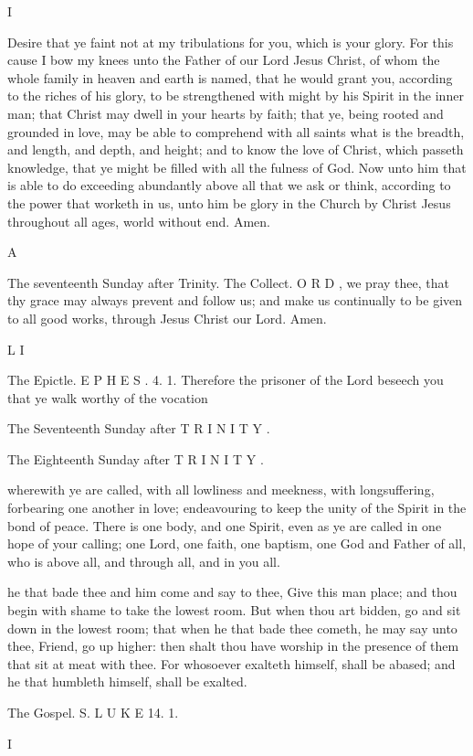 I

Desire that ye faint not at my tribulations for you, which is your glory. For this cause I bow my knees unto the Father of our Lord Jesus Christ, of whom the whole family in heaven and earth is named, that he would grant you, according to the riches of his glory, to be strengthened with might by his Spirit in the inner man; that Christ may dwell in your hearts by faith; that ye, being rooted and grounded in love, may be able to comprehend with all saints what is the breadth, and length, and depth, and height; and to know the love of Christ, which passeth knowledge, that ye might be filled with all the fulness of God. Now unto him that is able to do exceeding abundantly above all that we ask or think, according to the power that worketh in us, unto him be glory in the Church by Christ Jesus throughout all ages, world without end. Amen.

A

The seventeenth Sunday after Trinity. The Collect. O R D , we pray thee, that thy grace may always prevent and follow us; and make us continually to be given to all good works, through Jesus Christ our Lord. Amen.

L I

The Epictle. E P H E S . 4. 1. Therefore the prisoner of the Lord beseech you that ye walk worthy of the vocation

The Seventeenth Sunday after T R I N I T Y .

The Eighteenth Sunday after T R I N I T Y .

wherewith ye are called, with all lowliness and meekness, with longsuffering, forbearing one another in love; endeavouring to keep the unity of the Spirit in the bond of peace. There is one body, and one Spirit, even as ye are called in one hope of your calling; one Lord, one faith, one baptism, one God and Father of all, who is above all, and through all, and in you all.

he that bade thee and him come and say to thee, Give this man place; and thou begin with shame to take the lowest room. But when thou art bidden, go and sit down in the lowest room; that when he that bade thee cometh, he may say unto thee, Friend, go up higher: then shalt thou have worship in the presence of them that sit at meat with thee. For whosoever exalteth himself, shall be abased; and he that humbleth himself, shall be exalted.

The Gospel. S. L U K E 14. 1.

I

